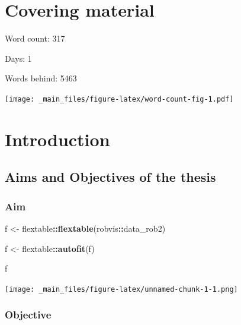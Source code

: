 \documentclass[a4paper, nobind]{templates/ociamthesis}
\newenvironment{Shaded}{\begin{snugshade}}{\end{snugshade}}
\newcommand{\KeywordTok}[1]{\textcolor[rgb]{0.13,0.29,0.53}{\textbf{#1}}}
\newcommand{\NormalTok}[1]{#1}
\newcommand{\OperatorTok}[1]{\textcolor[rgb]{0.81,0.36,0.00}{\textbf{#1}}}
\newcommand{\StringTok}[1]{\textcolor[rgb]{0.31,0.60,0.02}{#1}}
\renewenvironment{Shaded}
{
  \vspace{4pt}%
  \begin{snugshade}%
}{%
  \end{snugshade}%
  \vspace{4pt}%
}
\begin{document}
\flushbottom

\hypertarget{covering-material}{%
\chapter*{Covering material}\label{covering-material}}

\adjustmtc

Word count: 317

Days: 1

Words behind: 5463

\texttt{[image: \_main\_files/figure-latex/word-count-fig-1.pdf]}

\hypertarget{intro-intro}{%
\chapter{Introduction}\label{intro-intro}}

\minitoc 

\hypertarget{aims-and-objectives-of-the-thesis}{%
\section{Aims and Objectives of the thesis}\label{aims-and-objectives-of-the-thesis}}

\hypertarget{aim}{%
\subsection{Aim}\label{aim}}

\begin{Shaded}
\begin{Highlighting}[]
\NormalTok{f <-}\StringTok{ }\NormalTok{flextable}\OperatorTok{::}\KeywordTok{flextable}\NormalTok{(robvis}\OperatorTok{::}\NormalTok{data_rob2)}

\NormalTok{f <-}\StringTok{ }\NormalTok{flextable}\OperatorTok{::}\KeywordTok{autofit}\NormalTok{(f)}

\NormalTok{f}
\end{Highlighting}
\end{Shaded}

\texttt{[image: \_main\_files/figure-latex/unnamed-chunk-1-1.png]}

\hypertarget{objective}{%
\subsection{Objective}\label{objective}}
\end{document}
